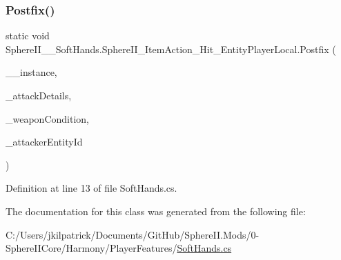 \subsubsection{\texorpdfstring{Postfix()}{Postfix()}}
{\footnotesize\ttfamily static void Sphere\+I\+I\+\_\+\+\_\+\+Soft\+Hands.\+Sphere\+I\+I\+\_\+\+Item\+Action\+\_\+\+Hit\+\_\+\+Entity\+Player\+Local.\+Postfix (\begin{DoxyParamCaption}\item[{Item\+Action\+Attack}]{\+\_\+\+\_\+instance,  }\item[{Item\+Action\+Attack.\+Attack\+Hit\+Info}]{\+\_\+attack\+Details,  }\item[{ref float}]{\+\_\+weapon\+Condition,  }\item[{int}]{\+\_\+attacker\+Entity\+Id }\end{DoxyParamCaption})\hspace{0.3cm}{\ttfamily [static]}}



Definition at line 13 of file Soft\+Hands.\+cs.



The documentation for this class was generated from the following file\+:\begin{DoxyCompactItemize}
\item 
C\+:/\+Users/jkilpatrick/\+Documents/\+Git\+Hub/\+Sphere\+I\+I.\+Mods/0-\/\+Sphere\+I\+I\+Core/\+Harmony/\+Player\+Features/\mbox{\hyperlink{_soft_hands_8cs}{Soft\+Hands.\+cs}}\end{DoxyCompactItemize}
